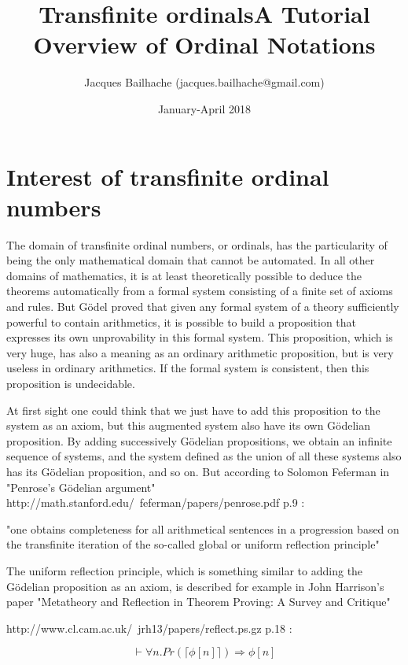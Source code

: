 \documentclass[10pt]{article}
\title{Transfinite ordinals}
\begin{document}
\title{A Tutorial Overview of Ordinal Notations}
\author{Jacques Bailhache (jacques.bailhache@gmail.com)}
\date{January-April 2018}

\maketitle

\setlength{\parindent}{0pt}

\section{Interest of transfinite ordinal numbers}

The domain of transfinite ordinal numbers, or ordinals, has the particularity of being the only mathematical domain that cannot be automated. In all other domains of mathematics, it is at least theoretically possible to deduce the theorems automatically from a formal system consisting of a finite set of axioms and rules. But Gödel proved that given any formal system of a theory sufficiently powerful to contain arithmetics, it is possible to build a proposition that expresses its own unprovability in this formal system. This proposition, which is very huge, has also a meaning as an ordinary arithmetic proposition, but is very useless in ordinary arithmetics. If the formal system is consistent, then this proposition is undecidable. 

At first sight one could think that we just have to add this proposition to the system as an axiom, but this augmented system also have its own Gödelian proposition. By adding successively Gödelian propositions, we obtain an infinite sequence of systems, and the system defined as the union of all these systems also has its Gödelian proposition, and so on. 
But according to Solomon Feferman in "Penrose’s Gödelian argument" http://math.stanford.edu/~feferman/papers/penrose.pdf p.9 : 

"one obtains completeness for all arithmetical sentences in a progression based on the transfinite iteration of the so-called global or uniform reflection principle" 

The uniform reflection principle, which is something similar to adding the Gödelian proposition as an axiom, is described for example in John Harrison's paper "Metatheory and Reflection in Theorem Proving: A Survey and Critique" 

http://www.cl.cam.ac.uk/~jrh13/papers/reflect.ps.gz p.18 : 

\[ \vdash \forall n . Pr(\lceil \phi[n] \rceil) \Rightarrow \phi[n] \]
\end{document}
